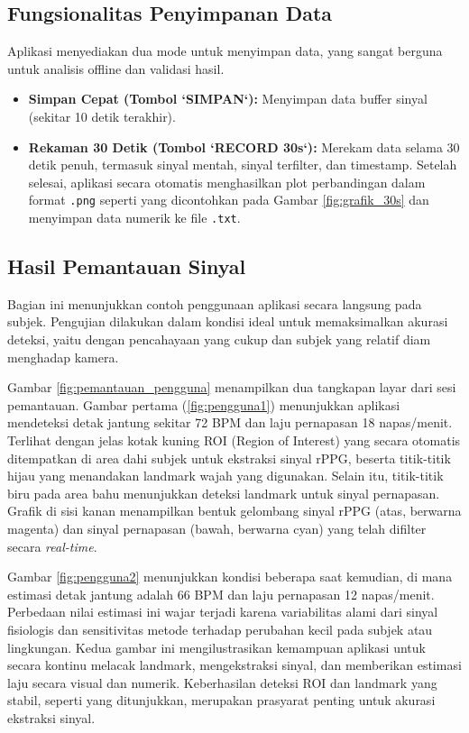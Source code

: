\documentclass[11pt,a4paper]{article}
\begin{document}
\subsection{Fungsionalitas Penyimpanan Data}
Aplikasi menyediakan dua mode untuk menyimpan data, yang sangat berguna untuk analisis offline dan validasi hasil.
\begin{itemize}
    \item \textbf{Simpan Cepat (Tombol `SIMPAN`):} Menyimpan data buffer sinyal (sekitar 10 detik terakhir).
    \item \textbf{Rekaman 30 Detik (Tombol `RECORD 30s`):} Merekam data selama 30 detik penuh, termasuk sinyal mentah, sinyal terfilter, dan timestamp. Setelah selesai, aplikasi secara otomatis menghasilkan plot perbandingan dalam format \texttt{.png} seperti yang dicontohkan pada Gambar \ref{fig:grafik_30s} dan menyimpan data numerik ke file \texttt{.txt}.
\end{itemize}

\subsection{Hasil Pemantauan Sinyal}
Bagian ini menunjukkan contoh penggunaan aplikasi secara langsung pada subjek. Pengujian dilakukan dalam kondisi ideal untuk memaksimalkan akurasi deteksi, yaitu dengan pencahayaan yang cukup dan subjek yang relatif diam menghadap kamera.

Gambar \ref{fig:pemantauan_pengguna} menampilkan dua tangkapan layar dari sesi pemantauan. Gambar pertama (\ref{fig:pengguna1}) menunjukkan aplikasi mendeteksi detak jantung sekitar 72 BPM dan laju pernapasan 18 napas/menit. Terlihat dengan jelas kotak kuning ROI (Region of Interest) yang secara otomatis ditempatkan di area dahi subjek untuk ekstraksi sinyal rPPG, beserta titik-titik hijau yang menandakan landmark wajah yang digunakan. Selain itu, titik-titik biru pada area bahu menunjukkan deteksi landmark untuk sinyal pernapasan. Grafik di sisi kanan menampilkan bentuk gelombang sinyal rPPG (atas, berwarna magenta) dan sinyal pernapasan (bawah, berwarna cyan) yang telah difilter secara \textit{real-time}.

Gambar \ref{fig:pengguna2} menunjukkan kondisi beberapa saat kemudian, di mana estimasi detak jantung adalah 66 BPM dan laju pernapasan 12 napas/menit. Perbedaan nilai estimasi ini wajar terjadi karena variabilitas alami dari sinyal fisiologis dan sensitivitas metode terhadap perubahan kecil pada subjek atau lingkungan. Kedua gambar ini mengilustrasikan kemampuan aplikasi untuk secara kontinu melacak landmark, mengekstraksi sinyal, dan memberikan estimasi laju secara visual dan numerik. Keberhasilan deteksi ROI dan landmark yang stabil, seperti yang ditunjukkan, merupakan prasyarat penting untuk akurasi ekstraksi sinyal.
\end{document}
